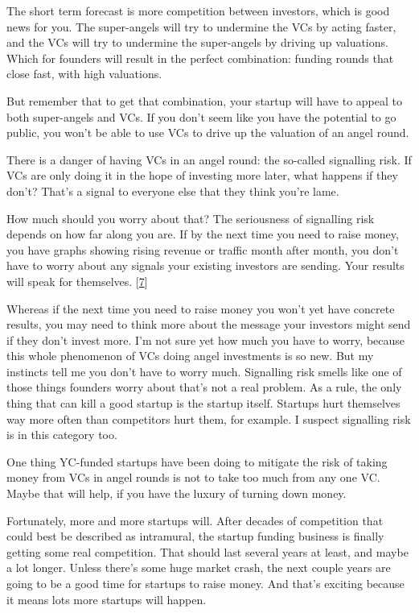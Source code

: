 The short term forecast is more competition between investors, which is
good news for you. The super-angels will try to undermine the VCs by
acting faster, and the VCs will try to undermine the super-angels by
driving up valuations. Which for founders will result in the perfect
combination: funding rounds that close fast, with high valuations.

But remember that to get that combination, your startup will have to
appeal to both super-angels and VCs. If you don't seem like you have the
potential to go public, you won't be able to use VCs to drive up the
valuation of an angel round.

There is a danger of having VCs in an angel round: the so-called
signalling risk. If VCs are only doing it in the hope of investing more
later, what happens if they don't? That's a signal to everyone else that
they think you're lame.

How much should you worry about that? The seriousness of signalling risk
depends on how far along you are. If by the next time you need to raise
money, you have graphs showing rising revenue or traffic month after
month, you don't have to worry about any signals your existing investors
are sending. Your results will speak for themselves.
{[}\hyperref[f7n]{7}{]}

Whereas if the next time you need to raise money you won't yet have
concrete results, you may need to think more about the message your
investors might send if they don't invest more. I'm not sure yet how
much you have to worry, because this whole phenomenon of VCs doing angel
investments is so new. But my instincts tell me you don't have to worry
much. Signalling risk smells like one of those things founders worry
about that's not a real problem. As a rule, the only thing that can kill
a good startup is the startup itself. Startups hurt themselves way more
often than competitors hurt them, for example. I suspect signalling risk
is in this category too.

One thing YC-funded startups have been doing to mitigate the risk of
taking money from VCs in angel rounds is not to take too much from any
one VC. Maybe that will help, if you have the luxury of turning down
money.

Fortunately, more and more startups will. After decades of competition
that could best be described as intramural, the startup funding business
is finally getting some real competition. That should last several years
at least, and maybe a lot longer. Unless there's some huge market crash,
the next couple years are going to be a good time for startups to raise
money. And that's exciting because it means lots more startups will
happen.

